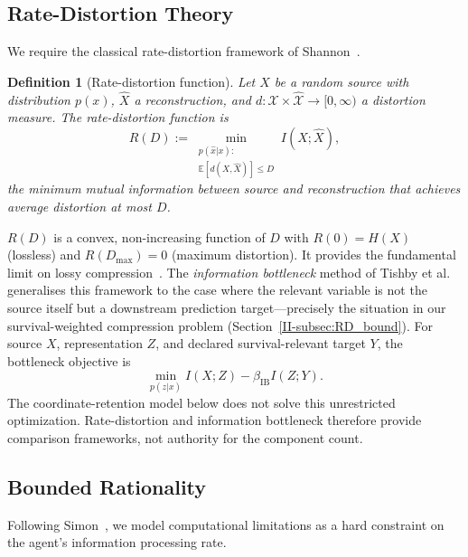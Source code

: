 \documentclass[12pt,a4paper,openany]{book}
\newtheorem{definition}[theorem]{Definition}
\begin{document}
\subsection{Rate-Distortion Theory}
\label{II-subsec:RD}

We require the classical rate-distortion framework
of Shannon~\cite{Shannon1959}.

\begin{definition}[Rate-distortion function]
\label{II-def:RD}
Let $X$ be a random source with distribution $p(x)$,
$\hat{X}$ a reconstruction, and
$d: \mathcal{X} \times \hat{\mathcal{X}} \to [0,\infty)$
a distortion measure.
The \emph{rate-distortion function} is
\begin{equation}
\label{II-eq:RD}
R(D) := \min_{\substack{p(\hat{x}|x):\\
  \mathbb{E}[d(X,\hat{X})] \leq D}} I(X; \hat{X}),
\end{equation}
the minimum mutual information between source and
reconstruction that achieves average distortion at most $D$.
\end{definition}

$R(D)$ is a convex, non-increasing function of $D$ with
$R(0) = H(X)$ (lossless) and
$R(D_{\max}) = 0$ (maximum distortion).
It provides the fundamental limit on lossy
compression~\cite{CoverThomas2006}.
The \emph{information bottleneck} method of
Tishby et al.~\cite{Tishby2000} generalises this framework
to the case where the relevant variable is not the source
itself but a downstream prediction target---precisely the
situation in our survival-weighted compression problem
(Section~\ref{II-subsec:RD_bound}).
For source $X$, representation $Z$, and declared survival-relevant
target $Y$, the bottleneck objective is
\begin{equation}
\min_{p(z|x)} I(X;Z)-\beta_{\mathrm{IB}} I(Z;Y).
\end{equation}
The coordinate-retention model below does not solve this unrestricted
optimization.  Rate-distortion and information bottleneck therefore
provide comparison frameworks, not authority for the component count.

\subsection{Bounded Rationality}
\label{II-subsec:bounded}

Following Simon~\cite{Simon1955}, we model computational
limitations as a hard constraint on the agent's information
processing rate.
\end{document}
